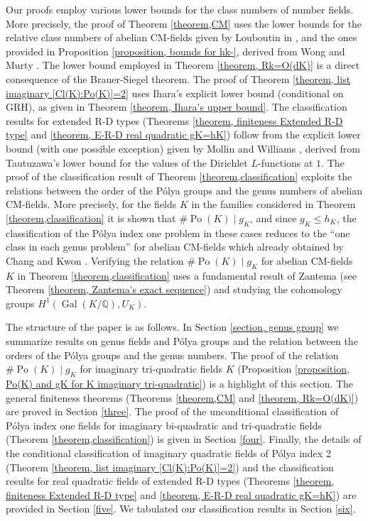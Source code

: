 \documentclass[12pt]{amsart}
\theoremstyle{definition}
\numberwithin{equation}{section}
\DeclareMathOperator{\Po}{Po}
\DeclareMathOperator{\Gal}{Gal}
\begin{document}
Our proofs employ various lower bounds for the class numbers of number fields. More precisely, the proof of Theorem \ref{theorem,CM} uses the lower bounds for the relative class numbers of abelian CM-fields given by Louboutin in \cite[Proof of Theorem 3.1]{Louboutin}, and the ones provided in Proposition \ref{proposition, bounds for hk-}, derived from Wong \cite{Peng-Jie} and Murty \cite{Murty}. The lower bound employed in Theorem \ref{theorem, Rk=O(dK)} is a direct consequence of the Brauer-Siegel theorem. The proof of Theorem \ref{theorem, list imaginary [Cl(K):Po(K)]=2} uses Ihara's explicit lower bound (conditional on GRH), as given in Theorem \ref{theorem, Ihara's upper bound}. The classification results for extended R-D types  (Theorems \ref{theorem, finiteness Extended R-D type} and \ref{theorem, E-R-D real quadratic gK=hK}) follow from the explicit lower bound (with one possible exception) given by Mollin and Williams \cite[p. 423]{MW}, derived from Tautuzawa's lower bound \cite{Tatuzawa} for the values of the Dirichlet $L$-functions at $1$. 
The proof of the classification result of Theorem \ref{theorem,classification} exploits the relations between the order of the P\'{o}lya groups and the genus numbers of abelian CM-fields. More precisely, for the fields $K$ in the families  considered in Theorem \ref{theorem,classification} it is shown that $\#\Po(K)\mid g_K$, and since $g_K \leq h_K$, the classification of the P\'olya index one problem in these cases reduces to the ``one class in each genus problem'' for abelian CM-fields which already obtained by Chang and Kwon \cite{CK}.
Verifying the relation $\#\Po(K)\mid g_K$ for abelian CM-fields $K$  in Theorem \ref{theorem,classification} uses a fundamental result of Zantema \cite{Zantema} (see Theorem \ref{theorem, Zantema's exact sequence}) and studying the cohomology groups $H^1(\Gal(K/\mathbb{Q}),U_K)$. 

The structure of the paper is as follows. In Section \ref{section, genus group} we summarize results on genus fields and P\'{o}lya groups and the relation between the orders of the P\'{o}lya groups and the genus numbers. The proof of the relation $\#\Po(K) \mid g_K$ for imaginary tri-quadratic fields $K$ (Proposition \ref{proposition, Po(K) and gK for K imaginary tri-quadratic}) is a highlight of this section. The general finiteness theorems (Theorems \ref{theorem,CM} and \ref{theorem, Rk=O(dK)}) are proved in Section \ref{three}. The proof of the unconditional classification of P\'{o}lya index one fields for imaginary bi-quadratic and tri-quadratic fields (Theorem \ref{theorem,classification}) is given in Section \ref{four}. Finally, the details of the conditional classification of imaginary quadratic fields of P\'{o}lya index 2 (Theorem \ref{theorem, list imaginary [Cl(K):Po(K)]=2}) and the classification results for real quadratic fields of extended R-D types (Theorems \ref{theorem, finiteness Extended R-D type} and \ref{theorem, E-R-D real quadratic gK=hK}) are provided in Section \ref{five}. We tabulated our classification results in Section \ref{six}.
\medskip\par
\end{document}
